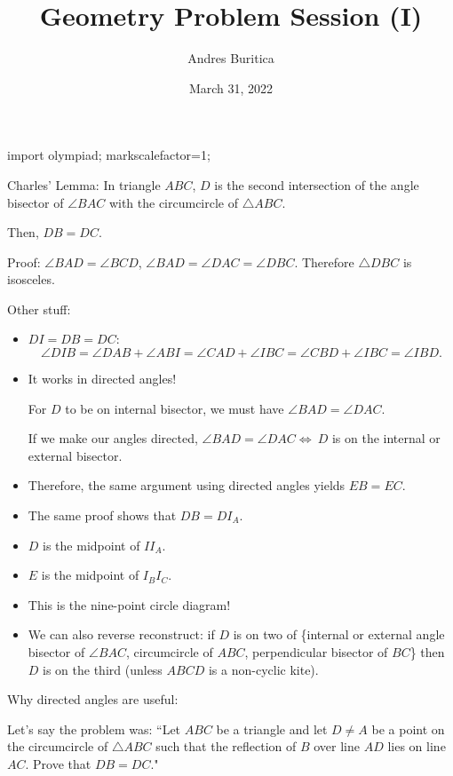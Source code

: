 \documentclass{article}
\title{Geometry Problem Session (I)}
\author{Andres Buritica}
\date{March 31, 2022}
\begin{document}
\maketitle
\begin{asydef}
  import olympiad;
  markscalefactor=1;
\end{asydef}
Charles' Lemma: In triangle $ABC$, $D$ is the second intersection of the angle
bisector of $\angle BAC$ with the circumcircle of $\triangle ABC$.

Then, $DB=DC$.

Proof: $\angle BAD=\angle BCD$, $\angle BAD=\angle DAC=\angle DBC$. Therefore
$\triangle DBC$ is isosceles.

Other stuff:
\begin{itemize}
  \item $DI=DB=DC$:
    \[\angle DIB=\angle DAB+\angle ABI=\angle CAD+\angle IBC=\angle CBD+\angle
      IBC=\angle IBD.\]
  \item It works in directed angles!

    For $D$ to be on internal bisector, we must have $\angle BAD=\angle DAC$.

    If we make our angles directed, $\angle BAD=\angle DAC\iff\ D$ is on the
    internal or external bisector.

  \item Therefore, the same argument using directed angles yields $EB=EC$.

  \item The same proof shows that $DB=DI_A$.
  \item $D$ is the midpoint of $II_A$.
  \item $E$ is the midpoint of $I_BI_C$.
  \item This is the nine-point circle diagram!
  \item We can also reverse reconstruct: if $D$ is on two of \{internal or
      external angle bisector of
    $\angle BAC$, circumcircle of $ABC$, perpendicular bisector of $BC$\} then
    $D$ is on the third (unless $ABCD$ is a non-cyclic kite).
\end{itemize}
Why directed angles are useful:

Let's say the problem was: ``Let $ABC$ be a triangle and let $D\ne A$ be a point
on the circumcircle of $\triangle ABC$ such that the reflection of $B$ over line
$AD$ lies on line $AC$. Prove that $DB=DC$."
\end{document}
